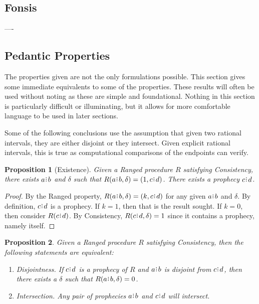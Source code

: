\documentclass[12pt]{article}
\newtheorem{proposition}{Proposition}[section]
\begin{document}
\subsection{Fonsis}

----

\subsection{Pedantic Properties }

The properties given are not the only formulations possible. This section gives some immediate equivalents to some of the properties. These results will often be used without noting as these are simple and foundational. Nothing in this section is particularly difficult or illuminating, but it allows for more comfortable language to be used in later sections. 

Some of the following conclusions use the assumption that given two rational intervals, they are either disjoint or they intersect. Given explicit rational intervals, this is true as computational comparisons of the endpoints can verify. 


\begin{proposition}[Existence]
    Given a Ranged procedure $R$ satisfying Consistency, there exists $a \rint b$ and $\delta$ such that $R(a \rint b, \delta) = (1, c\rint d)$. There exists a prophecy $c \rint d$.
\end{proposition}

\begin{proof}
    By the Ranged property, $R(a\rint b, \delta) = (k, c\rint d)$ for any given $a\rint b$ and $\delta$. By definition, $c\rint d$ is a prophecy. If $k = 1$, then that is the result sought. If $k=0$, then consider $R(c\rint d)$. By Consistency, $R(c\rint d, \delta) = 1$ since it contains a prophecy, namely itself.
\end{proof}



\begin{proposition}\label{os-prointer}
    Given a Ranged procedure $R$ satisfying Consistency, then the following statements are equivalent: 
    \begin{enumerate}
        \item Disjointness. 
           If $c\rint d$ is a prophecy of $R$ and $a\rint b$ is disjoint from $c\rint d$, then there exists a $\delta$ such that $R(a\rint b, \delta) = 0$.
        \item Intersection. Any pair of prophecies $a\rint b$ and $c\rint d$ will intersect. 
    \end{enumerate} 
\end{proposition}
\end{document}
